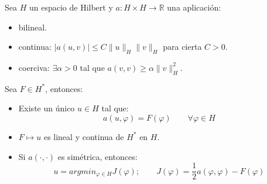 \begin{teo}\label{teo:lax_milgram}
    Sea $H$ un espacio de Hilbert y $a:H\times H\to\mathbb{R}$ una aplicación:
    \begin{itemize}
        \item bilineal.
        \item continua: $|a(u,v)|\leq C\|u\|_H\|v\|_H$ para cierta $C>0$.
        \item coerciva: $\exists \alpha>0$ tal que $a(v,v)\geq \alpha\|v\|_H^2$.
    \end{itemize}
    Sea $F\in H^\ast$, entonces:
    \begin{itemize}
        \item Existe un único $u\in H$ tal que:
            \begin{equation*}
                a(u,\varphi) = F(\varphi) \qquad \forall \varphi \in H
            \end{equation*}
        \item $F\longmapsto u$ es lineal y continua de $H^\ast$ en $H$.
        \item Si $a(\cdot ,\cdot )$ es simétrica, entonces:
            \begin{equation*}
                u = argmin_{\varphi \in H}J(\varphi); \qquad J(\varphi) = \frac{1}{2}a(\varphi,\varphi)-F(\varphi)
            \end{equation*}
    \end{itemize}
\end{teo}

